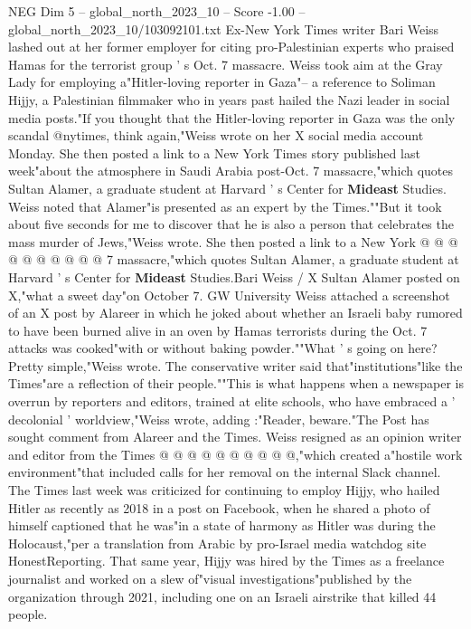 \begin{textsample}{NEG Dim 5 – global\_north\_2023\_10 – Score -1.00 – global\_north\_2023\_10/103092101.txt}  \label{ex:f5_neg_025}
Ex-New York Times writer Bari Weiss lashed out at her former employer for citing pro-Palestinian experts who praised Hamas for the terrorist group ' s Oct. 7 massacre.
Weiss took aim at the Gray Lady for employing a"Hitler-loving reporter in Gaza"-- a reference to Soliman Hijjy, a Palestinian filmmaker who in years past hailed the Nazi leader in social media posts."If you thought that the Hitler-loving reporter in Gaza was the only scandal @nytimes, think again,"Weiss wrote on her X social media account Monday.
She then posted a link to a New York Times story published last week"about the atmosphere in Saudi Arabia post-Oct. 7 massacre,"which quotes Sultan Alamer, a graduate student at Harvard ' s Center for \textbf{Mideast} Studies.
Weiss noted that Alamer"is presented as an expert by the Times.""But it took about five seconds for me to discover that he is also a person that celebrates the mass murder of Jews,"Weiss wrote.
She then posted a link to a New York @ @ @ @ @ @ @ @ @ @ 7 massacre,"which quotes Sultan Alamer, a graduate student at Harvard ' s Center for \textbf{Mideast} Studies.Bari Weiss / X Sultan Alamer posted on X,"what a sweet day"on October 7.
GW University Weiss attached a screenshot of an X post by Alareer in which he joked about whether an Israeli baby rumored to have been burned alive in an oven by Hamas terrorists during the Oct. 7 attacks was cooked"with or without baking powder.""What ' s going on here?
Pretty simple,"Weiss wrote.
The conservative writer said that"institutions"like the Times"are a reflection of their people.""This is what happens when a newspaper is overrun by reporters and editors, trained at elite schools, who have embraced a ' decolonial ' worldview,"Weiss wrote, adding :"Reader, beware."The Post has sought comment from Alareer and the Times.
Weiss resigned as an opinion writer and editor from the Times @ @ @ @ @ @ @ @ @ @,"which created a"hostile work environment"that included calls for her removal on the internal Slack channel.
The Times last week was criticized for continuing to employ Hijjy, who hailed Hitler as recently as 2018 in a post on Facebook, when he shared a photo of himself captioned that he was"in a state of harmony as Hitler was during the Holocaust,"per a translation from Arabic by pro-Israel media watchdog site HonestReporting.
That same year, Hijjy was hired by the Times as a freelance journalist and worked on a slew of"visual investigations"published by the organization through 2021, including one on an Israeli airstrike that killed 44 people.

\end{textsample}
